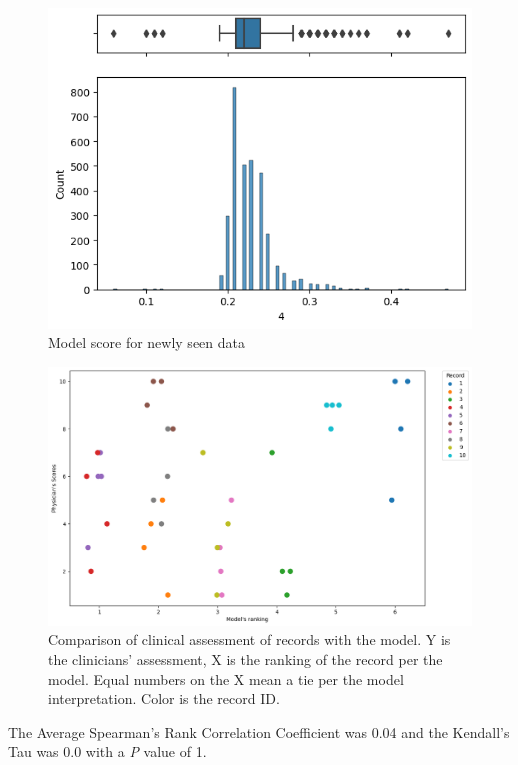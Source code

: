\begin{figure}[htbp]
\centering
\caption{Model score for newly seen data}\label{fig:scores} 
\includegraphics[scale=0.78]{figures/Scoring.png}
\end{figure}

\begin{figure}[htbp]
\centering
\caption{Comparison of clinical assessment of records with the model. Y is the clinicians' assessment, X is the ranking of the record per the model. Equal numbers on the X mean a tie per the model interpretation. Color is the record ID.}\label{fig:clinical_dq} 
\includegraphics[scale=0.52]{figures/clinical_assessment_dataqual_scatter.png}
\end{figure}

The Average Spearman's Rank Correlation Coefficient was 0.04 and the Kendall's Tau was 0.0 with a \textit{P} value of 1.
